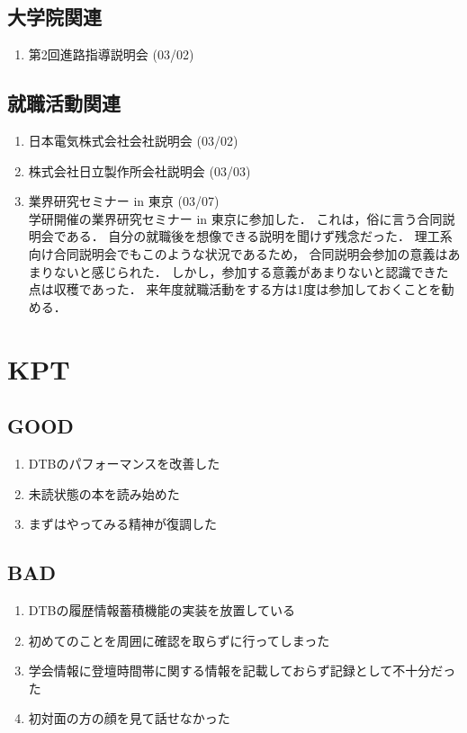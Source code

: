 \documentclass[fleqn, 12pt]{extarticlej}
\begin{document}
  \subsection{大学院関連}
  \begin{enumerate}
   \item 第2回進路指導説明会
         \hfill
         (03/02)
  \end{enumerate}

  \subsection{就職活動関連}
  \begin{enumerate}
   \item 日本電気株式会社会社説明会
         \hfill
         (03/02)
   \item 株式会社日立製作所会社説明会
         \hfill
         (03/03)
   \item 業界研究セミナー in 東京
         \hfill
         (03/07)\\
         学研開催の業界研究セミナー in 東京に参加した．
         これは，俗に言う合同説明会である．
         自分の就職後を想像できる説明を聞けず残念だった．
         理工系向け合同説明会でもこのような状況であるため，
         合同説明会参加の意義はあまりないと感じられた．
         しかし，参加する意義があまりないと認識できた点は収穫であった．
         来年度就職活動をする方は1度は参加しておくことを勧める．
  \end{enumerate}

\section{KPT}
  \subsection{GOOD}
  \begin{enumerate}
   \item DTBのパフォーマンスを改善した
   \item 未読状態の本\cite{uenishi2013a}を読み始めた
   \item まずはやってみる精神が復調した
  \end{enumerate}

  \subsection{BAD}
  \begin{enumerate}
   \item DTBの履歴情報蓄積機能の実装を放置している
   \item 初めてのことを周囲に確認を取らずに行ってしまった
   \item 学会情報に登壇時間帯に関する情報を記載しておらず記録として不十分だった
   \item 初対面の方の顔を見て話せなかった
  \end{enumerate}
\end{document}
